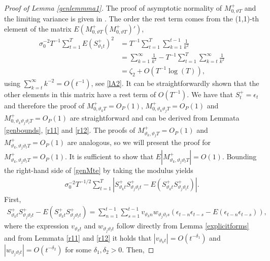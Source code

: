 {{\begin{lemma}
\end{lemma}
\begin{proof}[Proof of Lemma \ref{genlemmma1}]
The proof of asymptotic normality of $M^+_{0,\vartheta T}$ and the limiting variance is given in \textcite[(2.54) and (2.55)]{hualde2011gaussian}. The order the rest term comes from the (1,1)-th element of the matrix $E\left(M^+_{0,\vartheta T} (M^+_{0,\vartheta T})' \right) $, 
\begin{align*}
    \sigma_0^{-2} T^{-1}  \sum_{t = 1}^T E\left(S^+_{\vartheta_1t}\right)^2 &= T^{-1}  \sum_{t = 1}^T \sum_{k = 1}^{t-1} \frac{1}{k^2} \\
    &= \sum_{k = 1}^{\infty} \frac{1}{k^2} - T^{-1}  \sum_{t = 1}^T \sum_{k = t}^{\infty} \frac{1}{k^2} \\
    &= \zeta_2 + O(T^{-1}\log(T)),
\end{align*}
using $\sum_{k = t}^{\infty} k^{-2} = O(t^{-1})$, see \eqref{lA2}. It can be straightforwardly shown that the other elements in this matrix have a rest term of $O(T^{-1})$. We have that $S_t^+ = \epsilon_t$ and therefore the proof of $M^+_{0,\vartheta_k  T} = O_P(1)$, $M^+_{0,\vartheta_k \vartheta_j   T} = O_P(1)$ and  $M^+_{0,\vartheta_k \vartheta_j  \vartheta_l T} = O_P(1)$ are straightforward and can be derived from Lemmata \ref{genbounds}, \ref{r11} and \ref{r12}. The proofs of $ M^+_{\vartheta_k,\vartheta_j   T} = O_P(1)$ and $M^+_{\vartheta_k,\vartheta_j \vartheta_l  T} = O_P(1)$ are analogous, so we will present the proof for $M^+_{\vartheta_k,\vartheta_j \vartheta_l  T} = O_P(1)$. It is sufficient to show that $E |M^+_{\vartheta_k,\vartheta_j \vartheta_l  T}| = O(1)$. Bounding the right-hand side of \eqref{genMte} by taking the modulus yields 
\begin{align*}
    \sigma^{-2}_0 T^{-1/2} \sum_{t = 1}^T \left|  S^+_{\vartheta_k t} S^+_{ \vartheta_j \vartheta_l  t} - E\left( S^+_{\vartheta_k t} S^+_{\vartheta_j \vartheta_l  t} \right) \right|.
\end{align*}
First,  
\begin{align*}
     S^+_{\vartheta_k t} S^+_{ \vartheta_j \vartheta_l  t} - E\left( S^+_{\vartheta_k t} S^+_{\vartheta_j \vartheta_l  t} \right) = \sum_{n = 1}^{t-1} \sum_{s = 1}^{t-1} v_{\vartheta_k n} w_{ \vartheta_j \vartheta_l  s} \left( \epsilon_{t-n} \epsilon_{t-s} - E \left(\epsilon_{t-n} \epsilon_{t-s} \right)  \right),
\end{align*}
where the expression $v_{\vartheta_k t}$ and $ w_{ \vartheta_j \vartheta_l  t}$ follow directly from Lemma \ref{explicitforms} and from Lemmata \ref{r11} and \ref{r12} it holds that  $|v_{\vartheta_k t}| = O(t^{-\delta_1})$ and $| w_{ \vartheta_j \vartheta_l  t}| = O(t^{-\delta_2})$ for some $\delta_1,\delta_2 > 0$. Then,

\end{proof}}}
